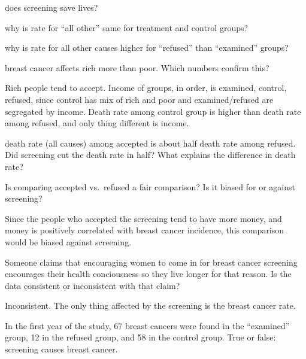 \documentclass[landscape]{exam}
\begin{document}
  \begin{itemize*}
    \item does screening save lives?
    \item why is rate for ``all other'' same for treatment and control groups?
    \item why is rate for all other causes higher for ``refused'' than
      ``examined'' groups?

    \item breast cancer affects rich more than poor. Which numbers confirm
      this?

      \begin{solution}
        Rich people tend to accept.  Income of groups, in order, is examined,
        control, refused, since control has mix of rich and poor and
        examined/refused are segregated by income.  Death rate among control
        group is higher than death rate among refused, and only thing different
        is income.
      \end{solution}

    \item death rate (all causes) among accepted is about half death rate among
      refused.  Did screening cut the death rate in half?  What explains the
      difference in death rate?

    \item Is comparing accepted vs.\ refused a fair comparison?  Is it biased for
      or against screening?

      \begin{solution}
        Since the people who accepted the screening tend to have more money, and
        money is positively correlated with breast cancer incidence, this
        comparison would be biased against screening.
      \end{solution}

    \item Someone claims that encouraging women to come in for breast cancer
      screening encourages their health conciousness so they live longer for
      that reason.  Is the data consistent or inconsistent with that claim?

      \begin{solution}
        Inconsistent.  The only thing affected by the screening is the breast
        cancer rate.
      \end{solution}

    \item In the first year of the study, 67 breast cancers were found in the
      ``examined'' group, 12 in the refused group, and 58 in the control group.
      True or false: screening causes breast cancer.


\end{itemize*}
\end{document}
